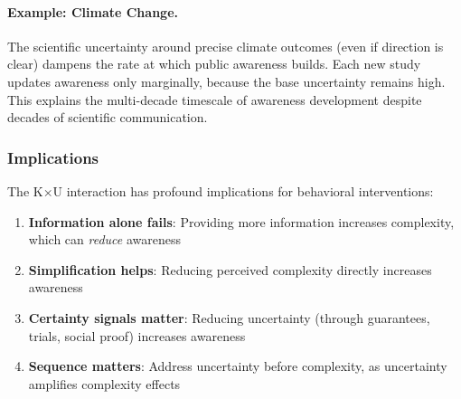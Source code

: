 \paragraph{Example: Climate Change.}
The scientific uncertainty around precise climate outcomes (even if direction 
is clear) dampens the rate at which public awareness builds. Each new study 
updates awareness only marginally, because the base uncertainty remains high.
This explains the multi-decade timescale of awareness development despite 
decades of scientific communication.

\subsubsection{Implications}

The K×U interaction has profound implications for behavioral interventions:

\begin{enumerate}
    \item \textbf{Information alone fails}: Providing more information 
          increases complexity, which can \emph{reduce} awareness
    \item \textbf{Simplification helps}: Reducing perceived complexity 
          directly increases awareness
    \item \textbf{Certainty signals matter}: Reducing uncertainty 
          (through guarantees, trials, social proof) increases awareness
    \item \textbf{Sequence matters}: Address uncertainty before complexity, 
          as uncertainty amplifies complexity effects
\end{enumerate}
